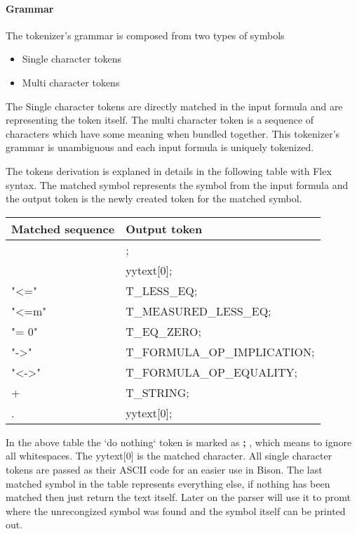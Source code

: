 \documentclass{article}
\begin{document}
		\paragraph{Grammar} The tokenizer's grammar is composed from two types of symbols
			\begin{itemize}
				\item Single character tokens
				\item Multi character tokens
			\end{itemize}
			The Single character tokens are directly matched in the input formula and are representing the token itself.
			The multi character token is a sequence of characters which have some meaning when bundled together.
			This tokenizer's grammar is unambiguous and each input formula is uniquely tokenized.

			The tokens derivation is explaned in details in the following table with Flex syntax. The matched symbol represents the 
			symbol from the input formula and the output token is the newly created token for the matched symbol.
		\begin{flushleft}
			\centering
			\begin{tabular}{ | m{10em} | m{15em}| } 
				\hline
					\textbf{Matched sequence} & \textbf{Output token} \\ [0.7ex] 
				\hline
					[ \textbackslash t \textbackslash  n] & ; \\ 
				\hline
					[,TF01()C\&|~*+-] 	& yytext[0];  \\
				\hline
				    "<="            &   T\_LESS\_EQ; \\
				\hline
				    "<=m"           &   T\_MEASURED\_LESS\_EQ; \\
				\hline
				    "= 0"           &   T\_EQ\_ZERO; \\
				\hline
				    "->"            &   T\_FORMULA\_OP\_IMPLICATION; \\
				\hline
				    "<->"           &   T\_FORMULA\_OP\_EQUALITY; \\
				\hline
				    [a-zA-Z0-9]+    &   T\_STRING; \\
				\hline
				    .               &   yytext[0]; \\
				\hline
			\end{tabular}
		\end{flushleft}
		In the above table the `do nothing` token is marked as \textbf{ ; }, which means to ignore all whitespaces.
		The yytext[0] is the matched character. All single character tokens are passed as their ASCII code for an easier use in Bison.
		The last matched symbol in the table represents everything else, if nothing has been matched then just return the text itself. 
		Later on the parser will use it to promt where the unrecongized symbol was found and the symbol itself can be printed out.
\end{document}
